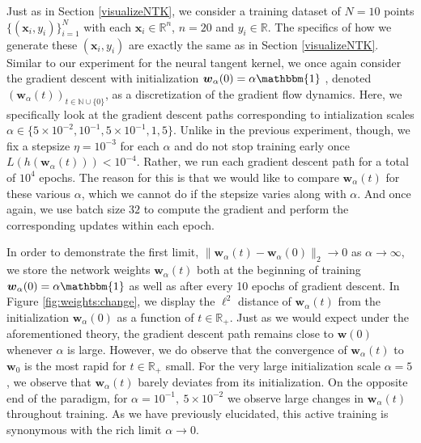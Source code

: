 \documentclass{article}
\begin{document}
Just as in Section \ref{visualizeNTK}, we consider a training dataset of $N = 10$ points $\{(\boldsymbol{x}_i, y_i) \}_{i=1}^N$ with each $\boldsymbol{x}_i \in \mathbb{R}^n$, $n=20$ and $y_i \in \mathbb{R}$. The specifics of how we generate these $(\boldsymbol{x}_i, y_i)$ are exactly the same as in Section \ref{visualizeNTK}. Similar to our experiment for the neural tangent kernel, we once again consider the gradient descent with initialization $\boldsymbol{w}_{\alpha}(0) = \alpha \mathbbm{1}$ , denoted $(\boldsymbol{w}_{\alpha}(t))_{t \in \mathbb{N} \cup \{ 0\}}$, as a discretization of the gradient flow dynamics. Here, we specifically look at the gradient descent paths corresponding to intialization scales $\alpha \in \{ 5\times10^{-2}, 10^{-1}, 5 \times 10^{-1}, 1, 5\}$. Unlike in the previous experiment, though, we fix a stepsize $\eta = 10^{-3}$ for each $\alpha$ and do not stop training early once $L(h(\boldsymbol{w}_{\alpha}(t))) < 10^{-4}$. Rather, we run each gradient descent path for a total of $10^4$ epochs. The reason for this is that we would like to compare $\boldsymbol{w}_{\alpha}(t)$ for these various $\alpha$, which we cannot do if the stepsize varies along with $\alpha$. And once again, we use batch size $32$ to compute the gradient and perform the corresponding updates within each epoch.

In order to demonstrate the first limit, $\| \boldsymbol{w}_{\alpha}(t) - \boldsymbol{w}_{\alpha}(0) \|_2 \rightarrow 0$ as $\alpha \rightarrow \infty$, we store the network weights $\boldsymbol{w}_{\alpha}(t)$ both at the beginning of training $\boldsymbol{w}_{\alpha}(0) = \alpha \mathbbm{1}$ as well as after every 10 epochs of gradient descent. In Figure \ref{fig:weights:change}, we display the $\ell^2$ distance of $\boldsymbol{w}_{\alpha}(t)$ from the initialization $\boldsymbol{w}_{\alpha}(0)$ as a function of $t \in \mathbb{R}_+$. Just as we would expect under the aforementioned theory, the gradient descent path remains close to $\boldsymbol{w}(0)$ whenever $\alpha$ is large. However, we do observe that the convergence of $\boldsymbol{w}_{\alpha}(t)$ to $\boldsymbol{w}_0$ is the most rapid for $t \in \mathbb{R}_+$ small. For the very large initialization scale $\alpha = 5$, we observe that $\boldsymbol{w}_{\alpha}(t)$ barely deviates from its initialization. On the opposite end of the paradigm, for $\alpha = 10^{-1}, \ 5 \times 10^{-2}$ we observe large changes in $\boldsymbol{w}_{\alpha}(t)$ throughout training. As we have previously elucidated, this active training is synonymous with the rich limit $\alpha \rightarrow 0$.
\end{document}
